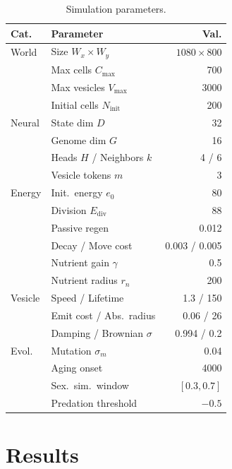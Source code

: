 \documentclass[10pt,twocolumn]{article}
\begin{document}
\begin{table}[t]
\centering
\small
\caption{Simulation parameters.}
\label{tab:params}
\begin{tabular}{@{}llr@{}}
\toprule
\textbf{Cat.} & \textbf{Parameter} & \textbf{Val.} \\
\midrule
World & Size $W_x \!\times\! W_y$ & $1080\!\times\!800$ \\
      & Max cells $C_{\max}$ & 700 \\
      & Max vesicles $V_{\max}$ & 3000 \\
      & Initial cells $N_{\text{init}}$ & 200 \\
\midrule
Neural & State dim $D$ & 32 \\
       & Genome dim $G$ & 16 \\
       & Heads $H$ / Neighbors $k$ & 4 / 6 \\
       & Vesicle tokens $m$ & 3 \\
\midrule
Energy & Init.\ energy $e_0$ & 80 \\
       & Division $E_{\text{div}}$ & 88 \\
       & Passive regen & 0.012 \\
       & Decay / Move cost & 0.003 / 0.005 \\
       & Nutrient gain $\gamma$ & 0.5 \\
       & Nutrient radius $r_n$ & 200 \\
\midrule
Vesicle & Speed / Lifetime & 1.3 / 150 \\
        & Emit cost / Abs.\ radius & 0.06 / 26 \\
        & Damping / Brownian $\sigma$ & 0.994 / 0.2 \\
\midrule
Evol. & Mutation $\sigma_m$ & 0.04 \\
      & Aging onset & 4000 \\
      & Sex.\ sim.\ window & $[0.3, 0.7]$ \\
      & Predation threshold & $-0.5$ \\
\bottomrule
\end{tabular}
\end{table}


\section{Results}
\label{sec:results}
\end{document}
